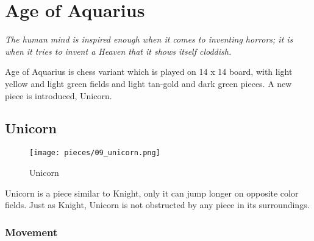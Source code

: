

\chapter*{Age of Aquarius}
\label{ch:Age of Aquarius}

\begin{flushright}
\parbox{0.8\textwidth}{
\emph{The human mind is inspired enough when it comes to inventing
horrors; it is when it tries to invent a Heaven that it shows itself
cloddish. \\
 } }
\end{flushright}

\noindent
Age of Aquarius is chess variant which is played on 14 x 14 board,
with light yellow and light green fields and light tan-gold and
dark green pieces. A new piece is introduced, Unicorn.

\clearpage %

\section*{Unicorn}
\label{sec:Age of Aquarius/Unicorn}

\noindent
\begin{wrapfigure}[5]{l}{0.4\textwidth}
\centering
\texttt{[image: pieces/09\_unicorn.png]}
\caption{Unicorn}
\label{fig:09_unicorn}
\end{wrapfigure}
Unicorn is a piece similar to Knight, only it can jump longer on
opposite color fields. Just as Knight, Unicorn is not obstructed
by any piece in its surroundings.

\vspace{6.0\baselineskip}
\subsection*{Movement}
\label{sec:Age of Aquarius/Unicorn/Movement}

